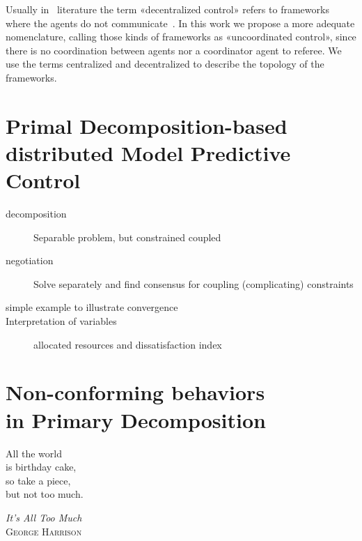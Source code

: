 \documentclass[../main.tex]{subfiles}
\begin{document}
\begin{remark}
  Usually in \dmpc\ literature the term «decentralized control» refers to frameworks where the agents do not communicate~\cite[\S 4]{ChristofidesEtAl2013}. In this work we propose a more adequate nomenclature, calling those kinds of frameworks as «uncoordinated control», since there is no coordination between agents nor a coordinator agent to referee. We use the terms centralized and decentralized to describe the topology of the frameworks.
\end{remark}

\printbibliography%

\chapter{Primal Decomposition-based distributed Model Predictive Control}
\begin{description}
  \item[decomposition] Separable problem, but constrained coupled
  \item[negotiation] Solve separately and find consensus for coupling (complicating) constraints
  \item[simple example to illustrate convergence]
  \item[Interpretation of variables] allocated resources and dissatisfaction index
\end{description}


\printbibliography%


\chapter[Non-conforming behaviors in Primary Decomposition]{Non-conforming behaviors\\ in Primary Decomposition}

\epigraph{\centering All the world\\ is birthday cake,\\ so take a piece, \\but not too much.}
{\textit{It's All Too Much}\\\textsc{George Harrison}}

\minitoc
\end{document}
